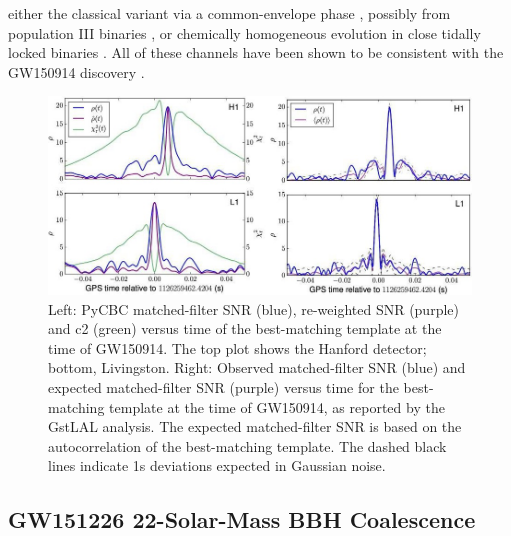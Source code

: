 \documentclass[binding=0.6cm, LaM]{sapthesis}
\begin{document}
	either the classical variant via a common-envelope phase \cite{76-81}, 
	possibly from population III binaries \cite{74, 75}, or chemically homogeneous evolution 
	in close tidally locked binaries \cite{72, 73}. 
	All of these channels have been shown to be consistent with the GW150914 discovery \cite{63-70}. 
		\begin{figure}[H]
                	\label{firstgw}
                	\includegraphics[scale=0.45]{firstgw}
                	\centering
                	\caption{Left: PyCBC matched-filter SNR (blue), re-weighted SNR (purple) 
				 and c2 (green) versus time of the best-matching template at the time of GW150914. 
				 The top plot shows the Hanford detector; bottom, Livingston. 
				 Right: Observed matched-filter SNR (blue) and expected matched-filter 
				 SNR (purple) versus time for the best-matching template at the time of GW150914, 
				 as reported by the GstLAL analysis. 
				 The expected matched-filter SNR is based on the autocorrelation of the best-matching template. 
				 The dashed black lines indicate 1s deviations expected in Gaussian noise.\cite{21}} 
                	\label{fig:firstgw}
                \end{figure}

\subsection{GW151226 22-Solar-Mass BBH Coalescence}
\end{document}
